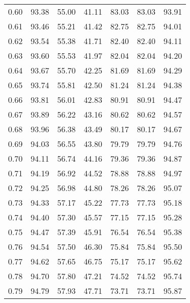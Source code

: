 \begin{tabular}{|c|c|c|c|c|c|c|}
      0.60 &     93.38 &     55.00 &      41.11 &   83.03 &      83.03 &         93.91 \\
      0.61 &     93.46 &     55.21 &      41.42 &   82.75 &      82.75 &         94.01 \\
      0.62 &     93.54 &     55.38 &      41.71 &   82.40 &      82.40 &         94.11 \\
      0.63 &     93.60 &     55.53 &      41.97 &   82.04 &      82.04 &         94.20 \\
      0.64 &     93.67 &     55.70 &      42.25 &   81.69 &      81.69 &         94.29 \\
      0.65 &     93.74 &     55.81 &      42.50 &   81.24 &      81.24 &         94.38 \\
      0.66 &     93.81 &     56.01 &      42.83 &   80.91 &      80.91 &         94.47 \\
      0.67 &     93.89 &     56.22 &      43.16 &   80.62 &      80.62 &         94.57 \\
      0.68 &     93.96 &     56.38 &      43.49 &   80.17 &      80.17 &         94.67 \\
      0.69 &     94.03 &     56.55 &      43.80 &   79.79 &      79.79 &         94.76 \\
      0.70 &     94.11 &     56.74 &      44.16 &   79.36 &      79.36 &         94.87 \\
      0.71 &     94.19 &     56.92 &      44.52 &   78.88 &      78.88 &         94.97 \\
      0.72 &     94.25 &     56.98 &      44.80 &   78.26 &      78.26 &         95.07 \\
      0.73 &     94.33 &     57.17 &      45.22 &   77.73 &      77.73 &         95.18 \\
      0.74 &     94.40 &     57.30 &      45.57 &   77.15 &      77.15 &         95.28 \\
      0.75 &     94.47 &     57.39 &      45.91 &   76.54 &      76.54 &         95.38 \\
      0.76 &     94.54 &     57.50 &      46.30 &   75.84 &      75.84 &         95.50 \\
      0.77 &     94.62 &     57.65 &      46.75 &   75.17 &      75.17 &         95.62 \\
      0.78 &     94.70 &     57.80 &      47.21 &   74.52 &      74.52 &         95.74 \\
      0.79 &     94.79 &     57.93 &      47.71 &   73.71 &      73.71 &         95.87 \\

\end{tabular}
